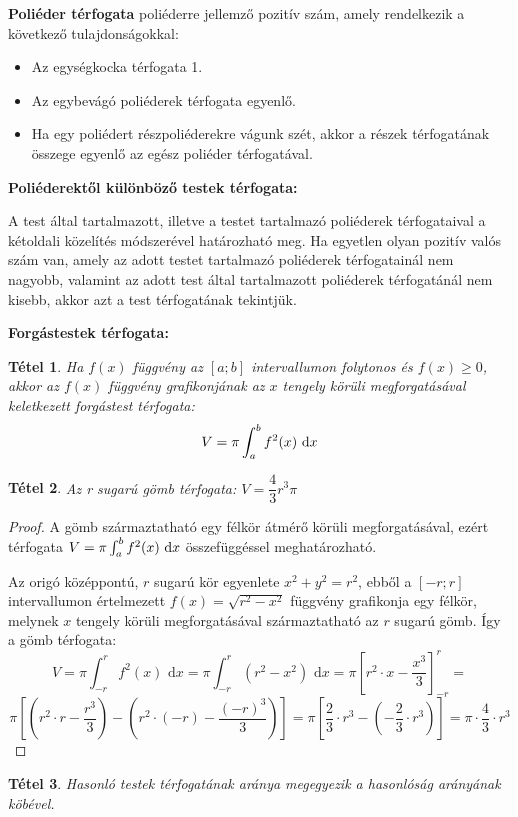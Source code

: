 \documentclass[12pt,a4paper]{article}
\newtheorem{theorem}{Tétel} [section]
\begin{document}
\textbf{Poliéder térfogata} poliéderre jellemző pozitív szám, amely rendelkezik a következő tulajdonságokkal:
\begin{itemize}
\item Az egységkocka térfogata 1.
\item Az egybevágó poliéderek térfogata egyenlő.
\item Ha egy poliédert részpoliéderekre vágunk szét, akkor a részek térfogatának összege egyenlő az egész poliéder térfogatával.
\end{itemize}

\textbf{Poliéderektől különböző testek térfogata:}

A test által tartalmazott, illetve a testet tartalmazó poliéderek térfogataival a kétoldali közelítés módszerével határozható meg. Ha egyetlen olyan pozitív valós szám van, amely az adott testet tartalmazó poliéderek térfogatainál nem nagyobb, valamint az adott test által tartalmazott poliéderek térfogatánál nem kisebb, akkor azt a test térfogatának tekintjük.

\textbf{Forgástestek térfogata:}
\begin{theorem}
Ha $f(x)$ függvény az $[a; b]$ intervallumon folytonos és $f(x) \geq 0$, akkor az $f(x)$ függvény grafikonjának az $x$ tengely körüli megforgatásával keletkezett forgástest térfogata:
$$V=\pi\int_a^bf^2(x){\normalfont\text{ d}}x$$
\end{theorem}
\begin{theorem}
 Az r sugarú gömb térfogata: $V=\dfrac{4}{3}r^3\pi$
\end{theorem}
\begin{proof}
A gömb származtatható egy félkör átmérő körüli megforgatásával, ezért térfogata $V=\pi\int_a^bf^2(x){\normalfont\text{ d}}x$  összefüggéssel meghatározható.

Az origó középpontú, $r$ sugarú kör egyenlete $x^2 + y^2 = r^2$, ebből a $[-r; r]$ intervallumon értelmezett $f(x)=\sqrt{r^2-x^2}$ függvény grafikonja egy félkör, melynek $x$ tengely körüli megforgatásával származtatható az $r$ sugarú gömb. Így a gömb térfogata:
$$V=\pi\int_{-r}^rf^2(x)\text{ d}x=\pi\int_{-r}^r(r^2-x^2)\text{ d}x=\pi\left[r^2\cdot x-\dfrac{x^3}{3} \right]^r_{-r}=$$
$$\pi\left[\left(r^2\cdot r-\dfrac{r^3}{3} \right)- \left(r^2\cdot (-r)-\dfrac{(-r)^3}{3} \right)\right]=\pi\left[\dfrac{2}{3}\cdot r^3-\left(-\dfrac{2}{3}\cdot r^3 \right) \right]=\pi\cdot \dfrac{4}{3}\cdot r^3$$
\end{proof}

\begin{theorem}
Hasonló testek térfogatának aránya megegyezik a hasonlóság arányának köbével.
\end{theorem}
\end{document}
